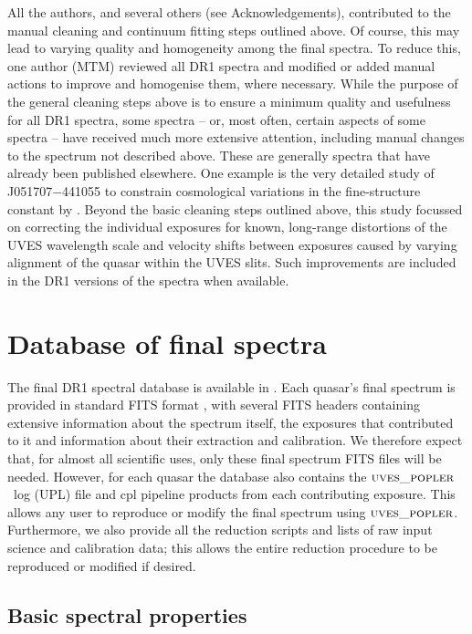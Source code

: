 \documentclass[fleqn,usenatbib,usedcolumn]{mnras}
\newcommand{\popler}{\ensuremath{\textsc{uves\_popler}}}
\begin{document}
All the authors, and several others (see Acknowledgements), contributed to the manual cleaning and continuum fitting steps outlined above. Of course, this may lead to varying quality and homogeneity among the final spectra. To reduce this, one author (MTM) reviewed all DR1 spectra and modified or added manual actions to improve and homogenise them, where necessary. While the purpose of the general cleaning steps above is to ensure a minimum quality and usefulness for all DR1 spectra, some spectra -- or, most often, certain aspects of some spectra -- have received much more extensive attention, including manual changes to the spectrum not described above. These are generally spectra that have already been published elsewhere. One example is the very detailed study of J051707$-$441055 to constrain cosmological variations in the fine-structure constant by \citet{Kotus:2017:3679}. Beyond the basic cleaning steps outlined above, this study focussed on correcting the individual exposures for known, long-range distortions of the UVES wavelength scale \citep[e.g.][]{Rahmani:2013:861,Whitmore:2015:446} and velocity shifts between exposures caused by varying alignment of the quasar within the UVES slits. Such improvements are included in the DR1 versions of the spectra when available.


\section{Database of final spectra}\label{s:database}

The final DR1 spectral database is available in \citet{Murphy:2018:UVESSQUADDR1}. Each quasar's final spectrum is provided in standard FITS format \citep{Wells:1981:363}, with several FITS headers containing extensive information about the spectrum itself, the exposures that contributed to it and information about their extraction and calibration. We therefore expect that, for almost all scientific uses, only these final spectrum FITS files will be needed. However, for each quasar the database also contains the \popler\ log (UPL) file and {\sc cpl} pipeline products from each contributing exposure. This allows any user to reproduce or modify the final spectrum using \popler. Furthermore, we also provide all the reduction scripts and lists of raw input science and calibration data; this allows the entire reduction procedure to be reproduced or modified if desired.

\subsection{Basic spectral properties}\label{ss:properties}
\end{document}
